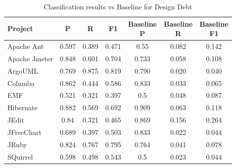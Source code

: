 \begin{table}[!hbt]
    \begin{center}
        \caption{Classification results vs Baseline for Design Debt}
        \label{tbl:classifier_results_vs_baseline_design}
        \begin{tabular}{l| c c c c c c}
        \toprule
        \textbf{Project} & \textbf{P} & \textbf{R} & \textbf{F1} & \thead{Baseline\\P} & \thead{Baseline\\R} & \thead{Baseline\\F1} \\
        \midrule
        Apache Ant    &               0.597 &            0.389 &        0.471     & 0.55           & 0.082     & 0.142  \\
        Apache Jmeter &               0.848 &            0.601 &        0.704     & 0.733          & 0.058     & 0.108  \\
        ArgoUML       &               0.769 &            0.875 &        0.819     & 0.790          & 0.020     & 0.040  \\
        Columba       &               0.862 &            0.444 &        0.586     & 0.833          & 0.033     & 0.065  \\
        EMF           &               0.521 &            0.321 &        0.397     & 0.5            & 0.048     & 0.087  \\
        Hibernate     &               0.882 &            0.569 &        0.692     & 0.909          & 0.063     & 0.118  \\
        JEdit         &                0.84 &            0.321 &        0.465     & 0.869          & 0.156     & 0.264  \\
        JFreeChart    &               0.689 &            0.397 &        0.503     & 0.833          & 0.022     & 0.044  \\
        JRuby         &               0.824 &            0.767 &        0.795     & 0.764          & 0.041     & 0.078  \\
        SQuirrel      &               0.598 &            0.498 &        0.543     & 0.5            & 0.023     & 0.044  \\
        \bottomrule
        \end{tabular}
    \end{center}    
\end{table}


